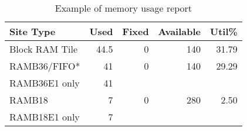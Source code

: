 \begin{table}[tbp]
  \centering
  \caption{Example of memory usage report}
  \label{tab:eg_memory}
  \begin{tabular}{|l|r|r|r|r|}
    \hline
Site Type         & Used & Fixed & Available & Util\% \\
\hline
Block RAM Tile       & 44.5 &     0 &       140 & 31.79  \\
\quad RAMB36/FIFO*   &   41 &     0 &       140 & 29.29  \\
\qquad RAMB36E1 only &   41 &       &           &        \\
\quad RAMB18         &    7 &     0 &       280 &  2.50  \\
\qquad RAMB18E1 only &    7 &       &           &        \\
\hline
  \end{tabular}
\end{table}

